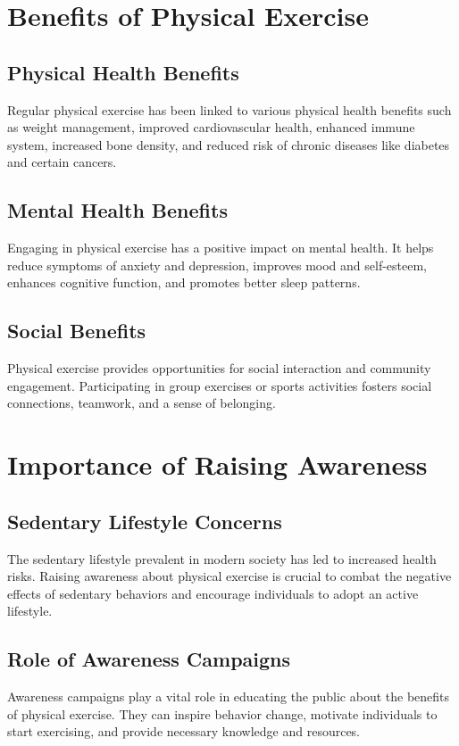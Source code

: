 \documentclass{article}
\begin{document}
\section{Benefits of Physical Exercise}
\subsection{Physical Health Benefits\cite{ref1}}
Regular physical exercise has been linked to various physical health benefits such as weight management, improved cardiovascular health, enhanced immune system, increased bone density, and reduced risk of chronic diseases like diabetes and certain cancers.

\subsection{Mental Health Benefits\cite{ref2}}
Engaging in physical exercise has a positive impact on mental health. It helps reduce symptoms of anxiety and depression, improves mood and self-esteem, enhances cognitive function, and promotes better sleep patterns.

\subsection{Social Benefits\cite{ref3}}
Physical exercise provides opportunities for social interaction and community engagement. Participating in group exercises or sports activities fosters social connections, teamwork, and a sense of belonging.

\section{Importance of Raising Awareness}
\subsection{Sedentary Lifestyle Concerns\cite{ref4}}
The sedentary lifestyle prevalent in modern society has led to increased health risks. Raising awareness about physical exercise is crucial to combat the negative effects of sedentary behaviors and encourage individuals to adopt an active lifestyle.

\subsection{Role of Awareness Campaigns\cite{ref5}}
Awareness campaigns play a vital role in educating the public about the benefits of physical exercise. They can inspire behavior change, motivate individuals to start exercising, and provide necessary knowledge and resources.
\end{document}
